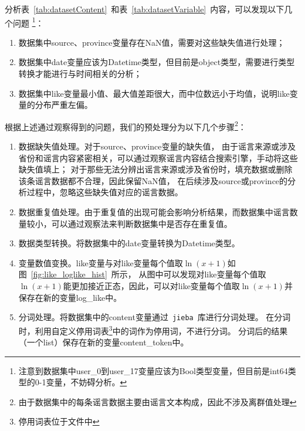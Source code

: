 分析表~\ref{tab:datasetContent}~和表~\ref{tab:datasetVariable}~内容，可以发现以下几个问题
\footnote{注意到数据集中user\_0到user\_17变量应该为Bool类型变量，但目前是int64类型的0-1变量，不妨碍分析。}：
\begin{enumerate}
    \item 数据集中source、province变量存在NaN值，需要对这些缺失值进行处理；
    \item 数据集中date变量应该为Datetime类型，但目前是object类型，需要进行类型转换才能进行与时间相关的分析；
    \item 数据集中like变量最小值、最大值差距很大，而中位数远小于均值，说明like变量的分布严重左偏。
\end{enumerate}

根据上述通过观察得到的问题，我们的预处理分为以下几个步骤\footnote{由于数据集中的每条谣言数据主要由谣言文本构成，因此不涉及离群值处理}：
\begin{enumerate}
    \item 数据缺失值处理。对于source、province变量的缺失值，
    由于谣言来源或涉及省份和谣言内容紧密相关，可以通过观察谣言内容结合搜索引擎，手动将这些缺失值填上；
    对于那些无法分辨出谣言来源或涉及省份时，填充数据或删除该条谣言数据都不合理，因此保留NaN值，
    在后续涉及source或province的分析过程中，忽略这些缺失值对应的谣言数据。
    \item 数据重复值处理。由于重复值的出现可能会影响分析结果，而数据集中谣言数量较小，可以通过观察法来判断数据集中是否存在重复值。
    \item 数据类型转换。将数据集中的date变量转换为Datetime类型。 %
    \item 变量数值变换。like变量与对like变量每个值取$\ln(x+1)$如图~\ref{fig:like_loglike_hist}~所示，
    从图中可以发现对like变量每个值取$\ln(x+1)$能更加接近正态，因此，可以对like变量每个值取$\ln(x+1)$并保存在新的变量log\_like中。
    \item 分词处理。将数据集中的content变量通过~\verb|jieba|~库进行分词处理。
    在分词时，利用自定义停用词表\footnote{停用词表位于文件中}中的词作为停用词，不进行分词。
    分词后的结果（一个list）保存在新的变量content\_token中。 %
\end{enumerate}


